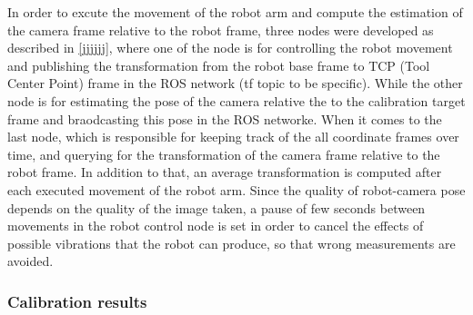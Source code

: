 In order to excute the movement of the robot arm and compute the estimation of the camera frame relative to the robot frame, three nodes were developed as described in \ref{jjjjjj}, where one of the node is for controlling the robot movement and publishing the transformation from the robot base frame to TCP (Tool Center Point) frame in the ROS network (tf topic to be specific). While the other node is for estimating the pose of the camera relative the to the calibration target frame and braodcasting this pose in the ROS networke. When it comes to the last node, which is responsible for keeping track of the all coordinate frames over time, and querying for the transformation of the camera frame relative to the robot frame. In addition to that, an average transformation is computed after each executed movement of the robot arm. Since the quality of robot-camera pose depends on the quality of the image taken, a pause of few seconds between movements in the robot control node is set in order to cancel the effects of possible vibrations that the robot can produce, so that wrong measurements are avoided.



\subsubsection{Calibration results}






